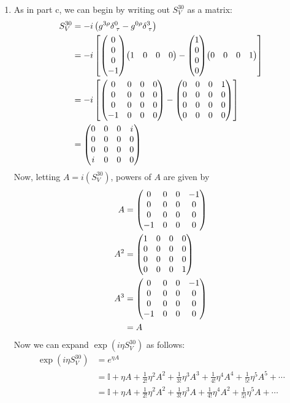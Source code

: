 \documentclass[12pt]{article}
\begin{document}
\begin{enumerate}[label=(\alph*)]
    \item As in part c, we can begin by writing out $S_V^{30}$ as a matrix:
    \begin{align*}
        S_V^{30} &= -i\left(g^{3\rho}\delta_{\;\tau}^0 - g^{0\rho}\delta_{\;\tau}^3 \right) \\
        &= -i\left[\mqty(0\\0\\0\\-1)\mqty(1&0&0&0) - \mqty(1\\0\\0\\0)\mqty(0&0&0&1)\right] \\
        &= -i\left[\mqty(0&0&0&0\\0&0&0&0\\0&0&0&0\\-1&0&0&0) - \mqty(0&0&0&1\\0&0&0&0\\0&0&0&0\\0&0&0&0)\right] \\
        &= \mqty(0&0&0&i\\0&0&0&0\\0&0&0&0\\i&0&0&0)
    \end{align*}
    Now, letting $A = i\left(S_V^{30}\right)$, powers of $A$ are given by
    \begin{align*}
        A &= \mqty(0&0&0&-1\\0&0&0&0\\0&0&0&0\\-1&0&0&0) \\
        A^2 &= \mqty(1&0&0&0\\0&0&0&0\\0&0&0&0\\0&0&0&1) \\
        A^3 &= \mqty(0&0&0&-1\\0&0&0&0\\0&0&0&0\\-1&0&0&0) \\
        &= A
    \end{align*}
    Now we can expand $\exp(i\eta S_V^{30})$ as follows:
    \begin{align*}
        \exp(i\eta S_V^{30}) &= e^{\eta A} \\
        &= \mathbb{I} + \eta A + \frac{1}{2!}\eta^2A^2 + \frac{1}{3!}\eta^3A^3 + \frac{1}{4!}\eta^4A^4 + \frac{1}{5!}\eta^5A^5 + \cdots \\
        &= \mathbb{I} + \eta A + \frac{1}{2!}\eta^2A^2 + \frac{1}{3!}\eta^3A + \frac{1}{4!}\eta^4A^2 + \frac{1}{5!}\eta^5A + \cdots \\

\end{align*}
\end{enumerate}
\end{document}
